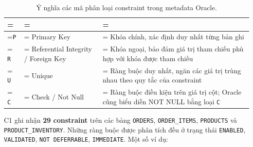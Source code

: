 \begin{table}[!htbp]
\centering
\caption{Ý nghĩa các mã phân loại constraint trong metadata Oracle.}\label{tab:tx-7}
\reporttablesetup
\begin{tabularx}{\linewidth}{|>{\hsize\linewidth=\hsize}L|>{\hsize\linewidth=\hsize}L|>{\hsize\linewidth=\hsize}L|}
\hline
{}
 &  &  \\ \hline
\texttt{P} & Primary Key & Khóa chính, xác định duy nhất từng bản ghi \\ \hline
\texttt{R} & Referential Integrity / Foreign Key & Khóa ngoại, bảo đảm giá trị tham chiếu phù hợp với khóa được tham chiếu \\ \hline
\texttt{U} & Unique & Ràng buộc duy nhất, ngăn các giá trị trùng nhau theo quy tắc của constraint \\ \hline
\texttt{C} & Check / Not Null & Ràng buộc điều kiện trên giá trị cột; Oracle cũng biểu diễn NOT NULL bằng loại \texttt{C} \\ \hline
\end{tabularx}
\end{table}
C1 ghi nhận \textbf{29 constraint} trên các bảng \texttt{ORDERS}, \texttt{ORDER\_\allowbreak{}ITEMS}, \texttt{PRODUCTS} và \texttt{PRODUCT\_\allowbreak{}INVENTORY}. Những ràng buộc được phân tích đều ở trạng thái \texttt{ENABLED}, \texttt{VALIDATED}, \texttt{NOT DEFERRABLE}, \texttt{IMMEDIATE}. Một số ví dụ:

